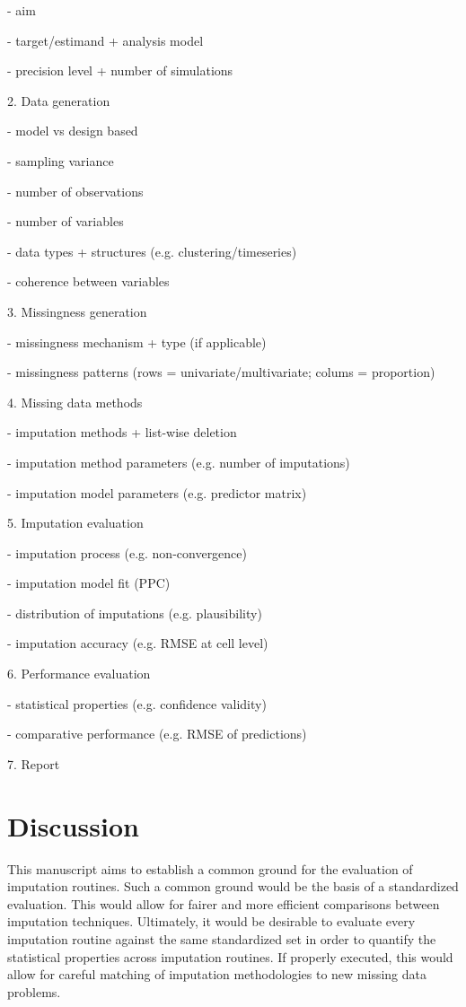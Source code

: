 \documentclass[bimj,fleqn]{w-art}
\begin{document}
- aim

- target/estimand + analysis model

- precision level + number of simulations

2. Data generation

- model vs design based

- sampling variance

- number of observations

- number of variables

- data types + structures (e.g. clustering/timeseries)

- coherence between variables

3. Missingness generation

- missingness mechanism + type (if applicable)

- missingness patterns (rows = univariate/multivariate; colums = proportion)

4. Missing data methods

- imputation methods + list-wise deletion

- imputation method parameters (e.g. number of imputations)

- imputation model parameters (e.g. predictor matrix)

5. Imputation evaluation

- imputation process (e.g. non-convergence)

- imputation model fit (PPC)

- distribution of imputations (e.g. plausibility)

- imputation accuracy (e.g. RMSE at cell level)

6. Performance evaluation

- statistical properties (e.g. confidence validity)

- comparative performance (e.g. RMSE of predictions)

7. Report



\section{Discussion}

This manuscript aims to establish a common ground for the evaluation of imputation routines. Such a common ground would be the basis of a standardized evaluation. This would allow for fairer and more efficient comparisons between imputation techniques. Ultimately, it would be desirable to evaluate every imputation routine against the same standardized set in order to quantify the statistical properties across imputation routines. If properly executed, this would allow for careful matching of imputation methodologies to new missing data problems. 
\end{document}

